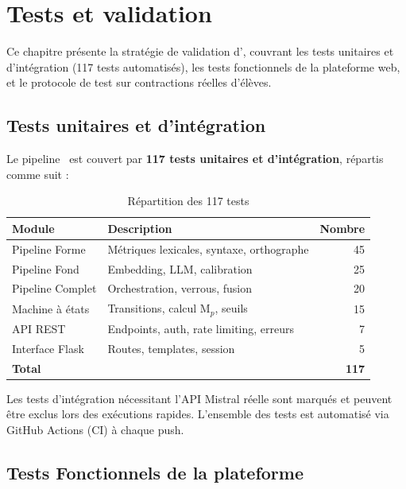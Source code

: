 \chapter{Tests et validation}
\label{ch:tests}

Ce chapitre présente la stratégie de validation d'\AZIZA, couvrant les tests unitaires et d'intégration (117 tests automatisés), les tests fonctionnels de la plateforme web, et le protocole de test sur contractions réelles d'élèves.

\section{Tests unitaires et d'intégration}

Le pipeline \AZIZA\ est couvert par \textbf{117 tests unitaires et d'intégration}, répartis comme suit :

\begin{table}[h]
\centering
\caption{Répartition des 117 tests}
\label{tab:tests}
\begin{tabularx}{\textwidth}{l X r}
\toprule
\textbf{Module} & \textbf{Description} & \textbf{Nombre} \\
\midrule
Pipeline Forme & Métriques lexicales, syntaxe, orthographe & 45 \\
Pipeline Fond & Embedding, LLM, calibration & 25 \\
Pipeline Complet & Orchestration, verrous, fusion & 20 \\
Machine à états & Transitions, calcul M\(_p\), seuils & 15 \\
API REST & Endpoints, auth, rate limiting, erreurs & 7 \\
Interface Flask & Routes, templates, session & 5 \\
\midrule
\textbf{Total} & & \textbf{117} \\
\bottomrule
\end{tabularx}
\end{table}

Les tests d'intégration nécessitant l'API Mistral réelle sont marqués et peuvent être exclus lors des exécutions rapides. L'ensemble des tests est automatisé via GitHub Actions (CI) à chaque push.

\section{Tests Fonctionnels de la plateforme}
\label{sec:tests-fonctionnels}

